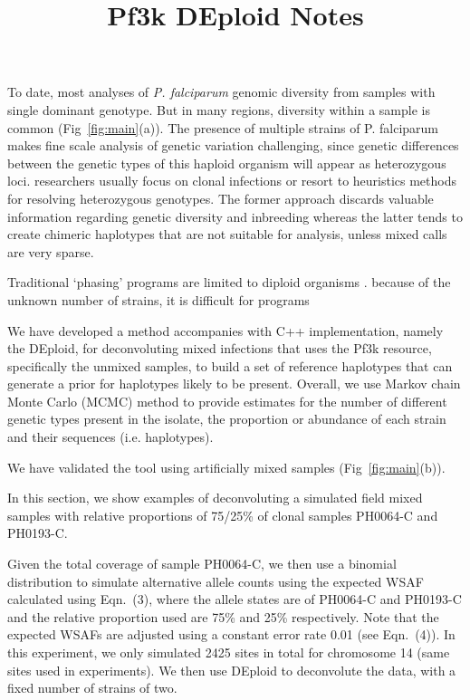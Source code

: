 \documentclass{article}
\title{Pf3k DEploid Notes}
\author{ }
\date{}
\begin{document}
\maketitle

To date, most analyses of {\it P. falciparum} genomic diversity from samples with single dominant genotype.  But in many regions, diversity within a sample is common (Fig~\ref{fig:main}(a)). The presence of multiple strains of P. falciparum makes fine scale
analysis of genetic variation challenging, since genetic differences between
the genetic types of this haploid organism will appear as heterozygous
loci. researchers usually focus on clonal infections or resort
to heuristics methods for resolving heterozygous genotypes. The former
approach discards valuable information regarding genetic diversity and
inbreeding whereas the latter tends to create chimeric haplotypes that are
not suitable for analysis, unless mixed calls are very sparse.


 Traditional ‘phasing’ programs are limited to diploid organisms \citet{impute, beagle}. because of the unknown number of strains, it is difficult for programs

We have developed a method accompanies with C++ implementation, namely the DEploid, for deconvoluting mixed infections that uses the Pf3k resource, specifically the unmixed samples, to build a set of reference haplotypes that can generate a prior for haplotypes likely to be present. Overall, we use Markov chain Monte Carlo (MCMC) method to provide estimates for the number of different genetic types present in the isolate, the proportion or abundance of each strain and their sequences (i.e. haplotypes).

We have validated the tool using artificially mixed samples (Fig~\ref{fig:main}(b)).

In this section, we show examples of deconvoluting a simulated field mixed samples with relative proportions of 75/25\% of clonal samples {\textmd PH0064-C} and {\textmd PH0193-C}.

Given the total coverage of sample {\textmd PH0064-C}, we then use a binomial distribution to simulate alternative allele counts using the expected WSAF calculated using \citet{Zhu2017} Eqn.~(3), where the allele states are of {\textmd PH0064-C} and {\textmd PH0193-C} and the relative proportion used are 75\% and 25\% respectively. Note that the expected WSAFs are adjusted using a constant error rate 0.01 (see Eqn.~(4)). In this experiment, we only simulated 2425 sites in total for chromosome 14 (same sites used in \citet{Zhu2017} experiments). We then use DEploid to deconvolute the data, with a fixed number of strains of two.
\end{document}
